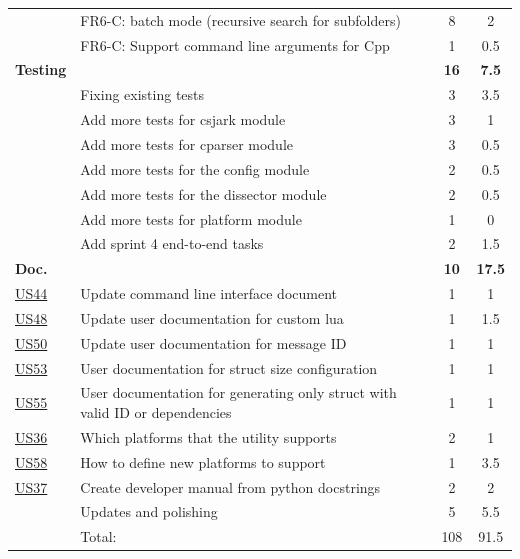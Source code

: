 \begin{table}[!htbp]
\begin{tabularx}{\textwidth}{l X c c}
	 & FR6-C: \Gls{batch mode} (recursive search for subfolders) &  8  & 2 \\
	 & FR6-C: Support command line arguments for Cpp & 1 & 0.5\\
	\addlinespace
	\textbf{Testing} &  & \textbf{16} & \textbf{7.5} \\
	 & Fixing existing tests & 3 & 3.5 \\
	 & Add more tests for csjark module & 3 & 1 \\
	 & Add more tests for cparser module & 3 & 0.5 \\
	 & Add more tests for the config module & 2 & 0.5 \\
	 & Add more tests for the dissector module & 2 & 0.5 \\
	 & Add more tests for platform module & 1 & 0 \\
	 & Add sprint 4 end-to-end tasks & 2 & 1.5 \\
	\addlinespace
	\textbf{Doc.} &  & \textbf{10} & \textbf{17.5} \\
	\hyperref[tab:req:stories10]{US44} & Update command line interface document & 1 & 1 \\
	\hyperref[tab:req:stories11]{US48} & Update user documentation for custom \Gls{lua} & 1 & 1.5 \\
	\hyperref[tab:req:stories12]{US50} & Update user documentation for message ID & 1 & 1 \\
	\hyperref[tab:req:stories12]{US53} & User documentation for \gls{struct} size configuration & 1 & 1 \\
	\hyperref[tab:req:stories12]{US55} & User documentation for generating only \gls{struct} with valid ID or dependencies & 1 & 1 \\
	\hyperref[tab:req:stories9]{US36} & Which platforms that the \gls{utility} supports & 2 & 1 \\
	\hyperref[tab:req:stories13]{US58} & How to define new platforms to support & 1 & 3.5 \\
	\hyperref[tab:req:stories9]{US37} & Create developer manual from python docstrings & 2 & 2 \\
	& Updates and polishing & 5 & 5.5 \\
	\midrule
	& Total: & 108 & 91.5 \\
	\bottomrule
\end{tabularx}
\end{table}

